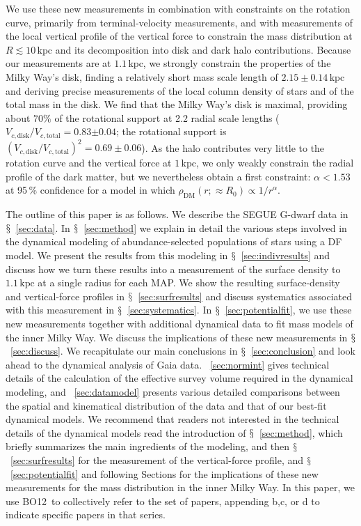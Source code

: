 \documentclass{emulateapj}
\newcommand{\sectionname}{$\mathsection$}
\newcommand{\map}{MAP}
\newcommand{\kpc}{\ensuremath{\,\mathrm{kpc}}}
\newcommand{\bo}{BO12}
\begin{document}
We use these new measurements in combination with constraints on the
rotation curve, primarily from terminal-velocity measurements, and
with measurements of the local vertical profile of the vertical force
to constrain the mass distribution at $R \lesssim10\kpc$ and its
decomposition into disk and dark halo contributions. Because our
measurements are at $1.1\kpc$, we strongly constrain the properties of
the Milky Way's disk, finding a relatively short mass scale length of
$2.15\pm0.14\kpc$ and deriving precise measurements of the local
column density of stars and of the total mass in the disk. We find
that the Milky Way's disk is maximal, providing about $70\%$ of the
rotational support at 2.2 radial scale lengths ($V_{c,\mathrm{disk}} /
V_{c,\mathrm{total}} = 0.83$$\pm$$0.04$; the rotational support is
$(V_{c,\mathrm{disk}} / V_{c,\mathrm{total}})^2 = 0.69 \pm 0.06$). As
the halo contributes very little to the rotation curve and the
vertical force at $1\kpc$, we only weakly constrain the radial profile
of the dark matter, but we nevertheless obtain a first constraint:
$\alpha < 1.53$ at 95\,\% confidence for a model in which
$\rho_{\mathrm{DM}} (r;\approx R_0) \propto 1 / r^{\alpha}$.

The outline of this paper is as follows. We describe the SEGUE G-dwarf
data in \sectionname~\ref{sec:data}. In \sectionname~\ref{sec:method}
we explain in detail the various steps involved in the dynamical
modeling of abundance-selected populations of stars using a DF
model. We present the results from this modeling in
\sectionname~\ref{sec:indivresults} and discuss how we turn these
results into a measurement of the surface density to $1.1\kpc$ at a
single radius for each \map. We show the resulting surface-density and
vertical-force profiles in \sectionname~\ref{sec:surfresults} and
discuss systematics associated with this measurement in
\sectionname~\ref{sec:systematics}. In
\sectionname~\ref{sec:potentialfit}, we use these new measurements
together with additional dynamical data to fit mass models of the
inner Milky Way. We discuss the implications of these new measurements
in \sectionname~\ref{sec:discuss}. We recapitulate our main
conclusions in \sectionname~\ref{sec:conclusion} and look ahead to the
dynamical analysis of Gaia data. \appendixname~\ref{sec:normint} gives
technical details of the calculation of the effective survey volume
required in the dynamical modeling, and
\appendixname~\ref{sec:datamodel} presents various detailed
comparisons between the spatial and kinematical distribution of the
data and that of our best-fit dynamical models. We recommend that
readers not interested in the technical details of the dynamical
models read the introduction of \sectionname~\ref{sec:method}, which
briefly summarizes the main ingredients of the modeling, and then
\sectionname~\ref{sec:surfresults} for the measurement of the
vertical-force profile, and \sectionname~\ref{sec:potentialfit} and
following Sections for the implications of these new measurements for
the mass distribution in the inner Milky Way. In this paper, we use
\bo\ to collectively refer to the set of
\citet{BovyNoThickDisk,BovyMAPkinematics,BovyMAPstructure} papers,
appending b,c, or d to indicate specific papers in that series.
\end{document}
